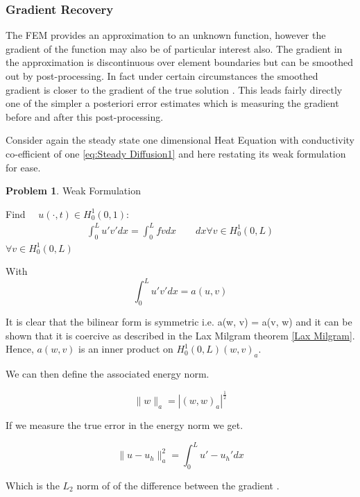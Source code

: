 \documentclass{uonmathreport}
\theoremstyle{definition}
\theoremstyle{problem}
\newtheorem{problem}{Problem}[section]
\theoremstyle{theorem}
\begin{document}
\subsubsection{Gradient Recovery} \label{subsubsec:KK}

The FEM provides an approximation to an unknown function, however the gradient of the function may also be of particular interest also. The gradient in the approximation is discontinuous over element boundaries but can be smoothed out by post-processing. In fact under certain circumstances the smoothed gradient is closer to the gradient of the true solution \cite{ainsworth65001posteriori}. This leads fairly directly one of the simpler a posteriori error estimates which is measuring the gradient before and after this post-processing.

Consider again the steady state one dimensional Heat Equation with conductivity co-efficient of one \ref{eq:Steady Diffusion1} and here restating its weak formulation for ease.

\begin{problem}{Weak Formulation}

Find $\quad u(\cdot, t) \in H^1_0(0, 1)$:
\begin{align*}
\int_0^L  u' v'  dx =   \int_0^L  f v dx  \quad \quad  dx \forall v \in H^1_0(0, L)
\end{align*}
$\forall v \in H^1_0(0, L)$
\end{problem}

With
\begin{equation*}
\int_0^L  u' v'  dx = a(u, v)  	
\end{equation*}

It is clear that the bilinear form is symmetric i.e.  a(w, v) = a(v, w) and it can be shown that it is coercive as described in the Lax Milgram theorem \ref{Lax Milgram}. Hence, $a(w, v)$ is an inner product on $H^1_0(0, L) (w, v)_a$.

We can then define the associated energy norm.

\begin{equation}
\|w\|_a = |(w, w)_a|^\frac{1}{2}
\end{equation}

If we measure the true error in the energy norm we get.

\begin{equation}
\|u-u_h\|_a^2 = \int_0^L  u' - u_h'  dx
\end{equation}

Which is the $L_2$ norm of of the difference between the gradient .
\end{document}
